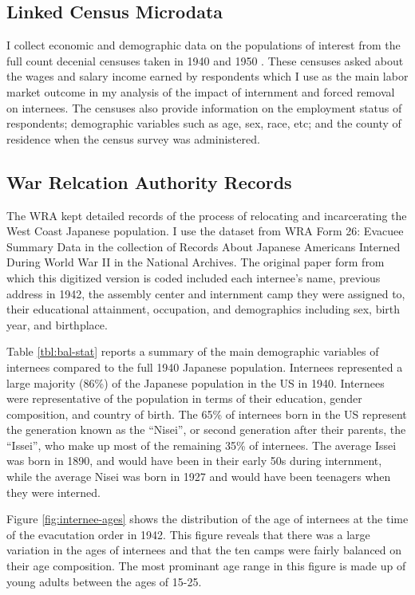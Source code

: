 \subsection{Linked Census Microdata}\label{sec:data-IPUMS}

I collect economic and demographic data on the populations of interest from the full count decenial censuses taken in 1940 and 1950
\citep{rugglesIPUMSAncestryFull2024}.
These censuses asked about the wages and salary income earned by respondents
which I use as the main labor market outcome in my analysis of the impact of internment and forced removal on internees.
The censuses also provide information on the employment status of respondents;
demographic variables such as age, sex, race, etc;
and the county of residence when the census survey was administered.


\subsection{War Relcation Authority Records}

The WRA kept detailed records of the process of relocating and incarcerating the West Coast Japanese population.
I use the dataset from WRA Form 26: Evacuee Summary Data in the collection of Records About Japanese Americans Interned During World War II in the National Archives.
The original paper form from which this digitized version is coded included each internee's name, previous address in 1942, the assembly center and internment camp they were assigned to,
their educational attainment, occupation, and demographics including sex, birth year, and birthplace.

Table \ref{tbl:bal-stat} reports a summary of the main demographic variables of internees compared to the full 1940 Japanese population.
Internees represented a large majority (86\%) of the Japanese population in the US in 1940.
Internees were representative of the population in terms of their education, gender composition, and country of birth.
The 65\% of internees born in the US represent the generation known as the ``Nisei'', or second generation after their parents, 
the ``Issei'', who make up most of the remaining 35\% of internees.
The average Issei was born in 1890, and would have been in their early 50s during internment,
while the average Nisei was born in 1927 and would have been teenagers when they were interned.

Figure \ref{fig:internee-ages} shows the distribution of the age of internees at the time of the evacutation order in 1942.
This figure reveals that there was a large variation in the ages of internees and that the ten camps were fairly balanced on their age composition.
The most prominant age range in this figure is made up of young adults between the ages of 15-25. 

